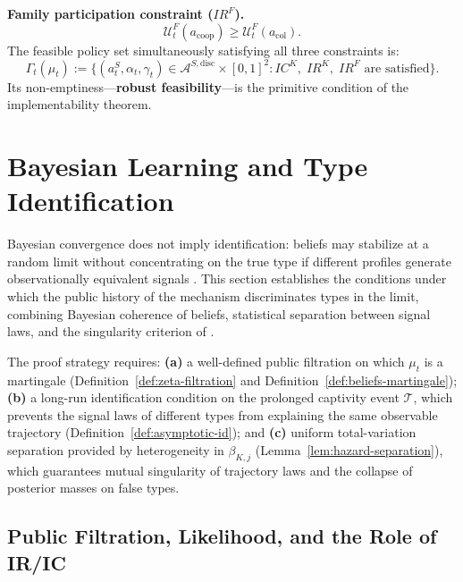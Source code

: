 \documentclass[12pt,a4paper]{article}
\providecommand{\textcite}{\citet}
\theoremstyle{plain}
\theoremstyle{definition}
\theoremstyle{remark}
\newcommand{\1}{\mathbf{1}}
\begin{document}
\noindent\textbf{Family participation constraint ($IR^F$).}
\begin{equation}
\label{eq:ir-family}
\mathcal{U}^F_t(a_{\mathrm{coop}})\ge\mathcal{U}^F_t(a_{\mathrm{col}}).
\end{equation}
The feasible policy set simultaneously satisfying all three constraints is:
\begin{equation}
\label{eq:gamma-factible}
\Gamma_t(\mu_t)
:=\bigl\{(a_t^S,\alpha_t,\gamma_t)\in\mathcal{A}^{S,\mathrm{disc}}\times[0,1]^2:
IC^K,\;IR^K,\;IR^F\text{ are satisfied}\bigr\}.
\end{equation}
Its non-emptiness---\textbf{robust feasibility}---is the primitive condition of the
implementability theorem.

\section{Bayesian Learning and Type Identification}
\label{sec:asymptotic-learning}

Bayesian convergence does not imply identification: beliefs may stabilize at a random
limit without concentrating on the true type if different profiles generate
observationally equivalent signals \textcite{Doob1953Stochastic,Williams1991Martingales,
Schervish1995Theory}. This section establishes the conditions under which the public
history of the mechanism discriminates types in the limit, combining Bayesian coherence
of beliefs, statistical separation between signal laws, and the singularity criterion
of \textcite{Kakutani1948,BlackwellDubins1962}.

The proof strategy requires: \textbf{(a)} a well-defined public filtration on which
$\mu_t$ is a martingale \textup{(}Definition~\ref{def:zeta-filtration} and
Definition~\ref{def:beliefs-martingale}\textup{)}; \textbf{(b)} a long-run
identification condition on the prolonged captivity event $\mathcal{T}$, which prevents
the signal laws of different types from explaining the same observable trajectory
\textup{(}Definition~\ref{def:asymptotic-id}\textup{)}; and \textbf{(c)} uniform
total-variation separation provided by heterogeneity in $\beta_{K,j}$
\textup{(}Lemma~\ref{lem:hazard-separation}\textup{)}, which guarantees mutual
singularity of trajectory laws and the collapse of posterior masses on false types.

\subsection{Public Filtration, Likelihood, and the Role of IR/IC}
\label{subsec:P-IR-IC-convergence-mu}
\end{document}
